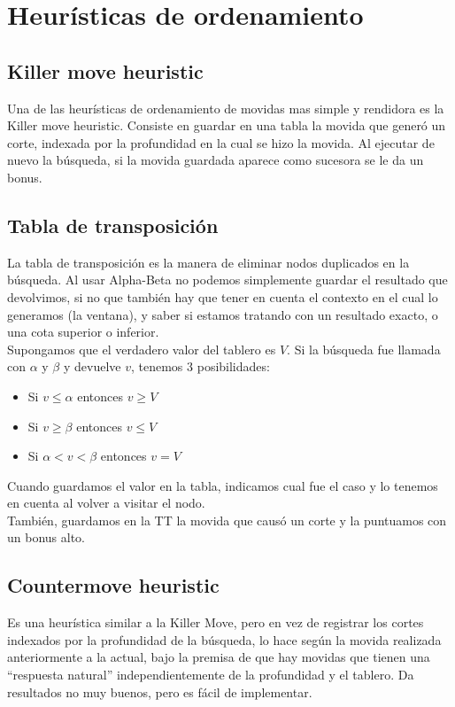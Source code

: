 \documentclass{article}
\begin{document}
\section{Heurísticas de ordenamiento}

\subsection{Killer move heuristic}
Una de las heurísticas de ordenamiento de movidas mas simple y
rendidora es la Killer move heuristic. Consiste en guardar en una tabla
la movida que generó un corte, indexada por la profundidad en la cual
se hizo la movida. Al ejecutar de nuevo la búsqueda, si la movida
guardada aparece como sucesora se le da un bonus.
\\

\subsection{Tabla de transposición}
La tabla de transposición es la manera de eliminar nodos duplicados
en la búsqueda. Al usar Alpha-Beta no podemos simplemente guardar el
resultado que devolvimos, si no que también hay que tener en cuenta
el contexto en el cual lo generamos (la ventana), y saber si estamos
tratando con un resultado exacto, o una cota superior o inferior.
\\

Supongamos que el verdadero valor del tablero es $V$. Si la búsqueda
fue llamada con $\alpha$ y $\beta$ y devuelve $v$, tenemos 3
posibilidades:

\begin{itemize}
\item Si $v \le \alpha$ entonces $v \ge V$
\item Si $v \ge \beta$ entonces $v \le V$
\item Si $\alpha < v < \beta$ entonces $v = V$
\end{itemize}

Cuando guardamos el valor en la tabla, indicamos cual fue el caso y lo
tenemos en cuenta al volver a visitar el nodo.
\\

También, guardamos en la TT la movida que causó un corte y la
puntuamos con un bonus alto.

\subsection{Countermove heuristic}
Es una heurística similar a la Killer Move, pero en vez de registrar
los cortes indexados por la profundidad de la búsqueda, lo hace según
la movida realizada anteriormente a la actual, bajo la premisa de que
hay movidas que tienen una ``respuesta natural'' independientemente de
la profundidad y el tablero. Da resultados no muy buenos, pero es fácil
de implementar.
\\
\end{document}
